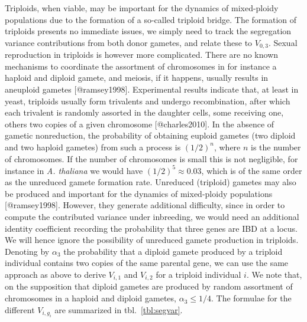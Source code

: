 Triploids, when viable, may be important for the dynamics of
mixed-ploidy populations due to the formation of a so-called triploid
bridge. The formation of triploids presents no immediate issues, we
simply need to track the segregation variance contributions from both
donor gametes, and relate these to \(V_{0,3}\). Sexual reproduction in
triploids is however more complicated. There are no known mechanisms to
coordinate the assortment of chromosomes in for instance a haploid and
diploid gamete, and meiosis, if it happens, usually results in aneuploid
gametes {[}@ramsey1998{]}. Experimental results indicate that, at least
in yeast, triploids usually form trivalents and undergo recombination,
after which each trivalent is randomly assorted in the daughter cells,
some receiving one, others two copies of a given chromosome
{[}@charles2010{]}. In the absence of gametic nonreduction, the
probability of obtaining euploid gametes (two diploid and two haploid
gametes) from such a process is \((1/2)^n\), where \(n\) is the number
of chromosomes. If the number of chromosomes is small this is not
negligible, for instance in \emph{A. thaliana} we would have
\((1/2)^5 \approx 0.03\), which is of the same order as the unreduced
gamete formation rate. Unreduced (triploid) gametes may also be produced
and important for the dynamics of mixed-ploidy populations
{[}@ramsey1998{]}. However, they generate additional difficulty, since
in order to compute the contributed variance under inbreeding, we would
need an additional identity coefficient recording the probability that
three genes are IBD at a locus. We will hence ignore the possibility of
unreduced gamete production in triploids. Denoting by \(\alpha_3\) the
probability that a diploid gamete produced by a triploid individual
contains two copies of the same parental gene, we can use the same
approach as above to derive \(V_{i,1}\) and \(V_{i,2}\) for a triploid
individual \(i\). We note that, on the supposition that diploid gametes
are produced by random assortment of chromosomes in a haploid and
diploid gametes, \(\alpha_3 \le 1/4\). The formulae for the different
\(V_{i,g_i}\) are summarized in tbl.~\ref{tbl:segvar}.

